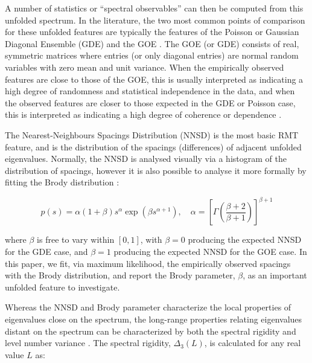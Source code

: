 \documentclass[10pt]{article}
\begin{document}
A number of statistics or ``spectral observables'' \citep{mehtaRandomMatrices2004} can then be
computed from this unfolded spectrum. In the literature, the two most common points of comparison
for these unfolded features are typically the features of the Poisson or Gaussian Diagonal Ensemble
(GDE) and the GOE
\cite[see e.g.][]{santhanamStatisticsAtmosphericCorrelations2001,jalanUncoveringRandomnessSuccess2014,bandyopadhyayUniversalityComplexNetworks2007,agrawalQuantifyingRandomnessProtein2014,raiRandomnessPreservedPatterns2015,
sebaRandomMatrixAnalysis2003,wangSpectralPropertiesTemporal2015,wangRandomMatrixTheory2016}. The
GOE (or GDE) consists of real, symmetric matrices where entries (or only diagonal entries) are
normal random variables with zero mean and unit variance. When the empirically observed features are
close to those of the GOE, this is usually interpreted as indicating a high degree of randomness and
statistical independence in the data, and when the observed features are closer to those expected in
the GDE or Poisson case, this is interpreted as indicating a high degree of coherence or dependence
\citep{santhanamStatisticsAtmosphericCorrelations2001,jalanUncoveringRandomnessSuccess2014,bandyopadhyayUniversalityComplexNetworks2007,agrawalQuantifyingRandomnessProtein2014,raiRandomnessPreservedPatterns2015,
sebaRandomMatrixAnalysis2003,wangSpectralPropertiesTemporal2015,wangRandomMatrixTheory2016,matharooSpontaneousBackpainAlters2020}.

The Nearest-Neighbours Spacings Distribution (NNSD) is the most basic RMT feature, and is the
distribution of the spacings (differences) of adjacent unfolded eigenvalues. Normally, the NNSD is
analysed visually via a histogram of the distribution of spacings, however it is also possible to
analyse it more formally by fitting the Brody distribution \citep{brodyStatisticalMeasureRepulsion1973}:

\[
p(s) = \alpha (1 + \beta) s^\alpha \exp({\beta s^{\alpha+1}}),
\quad \alpha = \left[ \Gamma \left( \frac{\beta+2}{\beta+1} \right) \right]^{\beta+1}
\]

where \(\beta\) is free to vary within \([0, 1]\), with \(\beta = 0\)  producing the expected NNSD
for the GDE case, and \(\beta = 1\) producing the expected NNSD for the GOE case. In this paper, we
fit, via maximum likelihood, the empirically observed spacings with the Brody distribution, and
report the Brody parameter, \(\beta\), as an important unfolded feature to investigate.

Whereas the NNSD and Brody parameter characterize the local properties of eigenvalues close on the
spectrum, the long-range properties relating eigenvalues distant on the spectrum can be
characterized by both the spectral rigidity and level number variance
\citep{guhrRandommatrixTheoriesQuantum1998a,mehtaRandomMatrices2004}. The spectral rigidity,
\(\Delta_3(L)\), is calculated for any real value \(L\) as:
\end{document}

